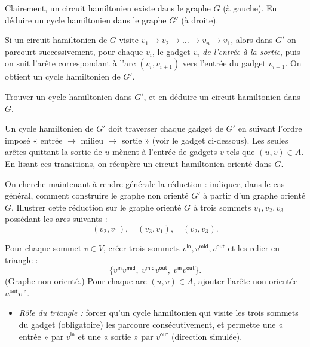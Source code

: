 \begin{exercice}[Le problème \textsc{Cycle Hamiltonien}\footnote{\textit{Source :} \url{https://www.youtube.com/watch?v=kl2k_wgYYic}.}]
  \begin{questions}
  \item Clairement, un circuit hamiltonien existe dans le graphe $G$ (à gauche).  
    En déduire un cycle hamiltonien dans le graphe $G'$ (à droite).
  \end{questions}
  \begin{corrections}
    Si un circuit hamiltonien de $G$ visite $v_1 \to v_2 \to \dots \to v_n \to v_1$, alors dans $G'$ on parcourt successivement,
    pour chaque $v_i$, le gadget $v_i$ \emph{de l'entrée à la sortie}, puis on suit l'arête correspondant à l'arc $(v_i,v_{i+1})$
    vers l'entrée du gadget $v_{i+1}$. On obtient un cycle hamiltonien de $G'$.
  \end{corrections}

  \begin{questions}
  \item Trouver un cycle hamiltonien dans $G'$, et en déduire un circuit hamiltonien dans $G$.
  \end{questions}
  \begin{corrections}
    Un cycle hamiltonien de $G'$ doit traverser chaque gadget de $G'$ en suivant
    l'ordre imposé « entrée $\to$ milieu $\to$ sortie » (voir le gadget ci-dessous).
    Les seules arêtes quittant la sortie de $u$ mènent à l'entrée de gadgets $v$ tels que $(u,v)\in A$.
    En lisant ces transitions, on récupère un circuit hamiltonien orienté dans $G$.
  \end{corrections}

  \begin{questions}
  \item On cherche maintenant à rendre générale la réduction : indiquer, dans le cas général, comment construire le graphe non orienté $G'$ à partir d'un graphe orienté $G$.  
    Illustrer cette réduction sur le graphe orienté $G$ à trois sommets $v_1, v_2, v_3$ possédant les arcs suivants :
    $$(v_2, v_1),\quad (v_3, v_1),\quad (v_2, v_3).$$
  \end{questions}
  \begin{corrections}
    Pour chaque sommet $v\in V$, créer trois sommets $v^{\mathsf{in}}, v^{\mathsf{mid}}, v^{\mathsf{out}}$ et les relier en triangle :
    \[
    \{v^{\mathsf{in}}v^{\mathsf{mid}},\ v^{\mathsf{mid}}v^{\mathsf{out}},\ v^{\mathsf{in}}v^{\mathsf{out}}\}.
    \]
    (Graphe non orienté.)  
    Pour chaque arc $(u,v)\in A$, ajouter l'arête non orientée $u^{\mathsf{out}}v^{\mathsf{in}}$.
    \begin{itemize}
    \item \emph{Rôle du triangle :} forcer qu'un cycle hamiltonien qui visite les trois sommets du gadget (obligatoire) les parcoure consécutivement, et permette une « entrée » par $v^{\mathsf{in}}$ et une « sortie » par $v^{\mathsf{out}}$ (direction simulée).
    \end{itemize}


\end{corrections}
\end{exercice}
